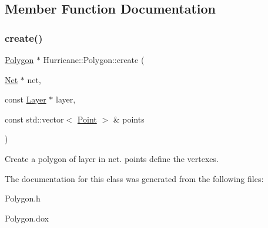\subsection{Member Function Documentation}
\mbox{\label{classHurricane_1_1Polygon_ac248679558ff51bf509b28050027b7da}} 
\subsubsection{\texorpdfstring{create()}{create()}}
{\footnotesize\ttfamily \mbox{\hyperlink{classHurricane_1_1Polygon}{Polygon}} $\ast$ Hurricane\+::\+Polygon\+::create (\begin{DoxyParamCaption}\item[{\mbox{\hyperlink{classHurricane_1_1Net}{Net}} $\ast$}]{net,  }\item[{const \mbox{\hyperlink{classHurricane_1_1Layer}{Layer}} $\ast$}]{layer,  }\item[{const std\+::vector$<$ \mbox{\hyperlink{classHurricane_1_1Point}{Point}} $>$ \&}]{points }\end{DoxyParamCaption})\hspace{0.3cm}{\ttfamily [static]}}

Create a polygon of {\ttfamily layer} in {\ttfamily net}. {\ttfamily points} define the vertexes. 

The documentation for this class was generated from the following files\+:\begin{DoxyCompactItemize}
\item 
Polygon.\+h\item 
Polygon.\+dox\end{DoxyCompactItemize}
